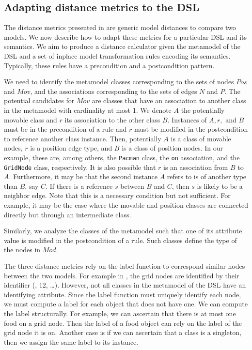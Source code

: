 \subsection{Adapting distance metrics to the DSL}

The distance metrics presented in  are generic model distances to compare two models.
We now describe how to adapt these metrics for a particular DSL and its semantics.
We aim to produce a distance calculator given the metamodel of the DSL and a set of inplace model transformation rules encoding its semantics.
Typically, these rules have a precondition and a postcondition pattern.

We need to identify the metamodel classes corresponding to the sets of nodes $Pos$ and $Mov$, and the associations corresponding to the sets of edges $N$ and $P$.
The potential candidates for $Mov$ are classes that have an association to another class in the metamodel with cardinality at most 1.
We denote $A$ the potentially movable class and $r$ its association to the other class $B$.
Instances of $A,r,$ and $B$ must be in the precondition of a rule and $r$ must be modified in the postcondition to reference another class instance.
Then, potentially $A$ is a class of movable nodes, $r$ is a position edge type, and $B$ is a class of position nodes.
In our example, these are, among others, the \texttt{Pacman} class, the \texttt{on} association, and the \texttt{GridNode} class, respectively.
It is also possible that $r$ is an association from $B$ to $A$.
Furthermore, it may be that the second instance $A$ refers to is of another type than $B$, say $C$.
If there is a reference $s$ between $B$ and $C$, then $s$ is likely to be a neighbor edge.
Note that this is a necessary condition but not sufficient.
For example, it may be the case where the movable and position classes are connected directly but through an intermediate class.

Similarly, we analyze the classes of the metamodel such that one of its attribute value is modified in the postcondition of a rule.
Such classes define the type of the nodes in $Mod$.

The three distance metrics rely on the label function to correspond similar nodes between the two models.
For example in , the grid nodes are identified by their identifier (, 12, \ldots).
However, not all classes in the metamodel of the DSL have an identifying attribute.
Since the label function must uniquely identify each node, we must compute a label for each object that does not have one.
We can compute the label structurally.
For example, we can ascertain that there is at most one food on a grid node.
Then the label of a food object can rely on the label of the grid node it is on.
Another case is if we can ascertain that a class is a singleton, then we assign the same label to its instance.

